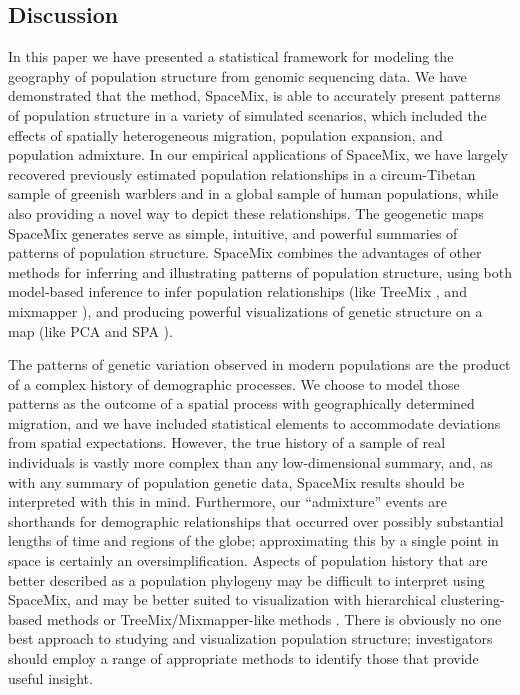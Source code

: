 \documentclass[12pt]{article}
\newcommand{\gc}[1]{{\it\color{blue}{(#1)}}}
\begin{document}
\subsection*{Discussion}
In this paper we have presented a statistical framework for modeling the geography of population structure from genomic sequencing data.
We have demonstrated that the method, SpaceMix, is able to accurately present patterns of population structure in a variety of simulated scenarios, which included the effects of spatially heterogeneous migration, population expansion, and population admixture.  In our empirical applications of SpaceMix, we have largely recovered previously estimated population relationships in a circum-Tibetan sample of greenish warblers and in a global sample of human populations, while also providing a novel way to depict these relationships.  The geogenetic maps SpaceMix generates serve as simple, intuitive, and powerful summaries of patterns of population structure. 
SpaceMix combines the advantages of other methods for inferring and illustrating patterns of population structure, 
using both model-based inference to infer population relationships (like TreeMix \citep{Treemix}, and mixmapper \citep{lipson_mixmapper_2013}), 
and producing powerful visualizations of genetic structure on a map (like PCA \citep{Patterson2006} and SPA \citep{Yang_2014_SPA}).

The patterns of genetic variation observed in modern populations are the product of a complex history of demographic processes.  We choose to model those patterns as the outcome of a spatial process with geographically determined migration,
and we have included statistical elements to accommodate deviations from spatial expectations.
However, the true history of a sample of real individuals is vastly more complex than any low-dimensional summary,
and, as with any summary of population genetic data, 
SpaceMix results should be interpreted with this in mind.
Furthermore, our ``admixture'' events are shorthands for demographic relationships
that occurred over possibly substantial lengths of time and regions of the globe;
approximating this by a single point in space is certainly an oversimplification.
Aspects of population history that are better described as a population phylogeny may be difficult to interpret using SpaceMix,
and may be better suited to visualization with hierarchical clustering-based methods \citep{STRUCTURE} or TreeMix/Mixmapper-like methods \citep{Treemix,lipson_mixmapper_2013}.  
There is obviously no one best approach to studying and visualization population structure;
investigators should employ a range of appropriate methods to identify those that provide useful insight. 
\end{document}
